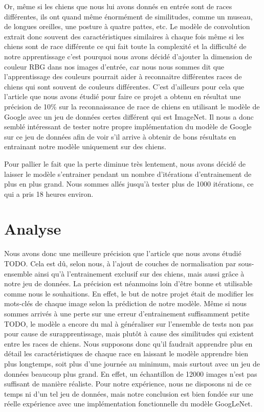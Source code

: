 \documentclass{article}
\begin{document}
Or, même si les chiens que nous lui avons donnés en entrée sont de races
différentes, ils ont quand même énormément de similitudes, comme un museau, de
longues oreilles, une posture à quatre pattes, etc. Le modèle de convolution
extrait donc souvent des caractéristiques similaires à chaque fois même si les
chiens sont de race différente ce qui fait toute la complexité et la difficulté
de notre apprentissage c’est pourquoi nous avons décidé d’ajouter la dimension
de couleur RBG dans nos images d’entrée, car nous nous sommes dit que
l’apprentissage des couleurs pourrait aider à reconnaitre différentes races de
chiens qui sont souvent de couleurs différentes. C’est d’ailleurs pour cela que
l’article que nous avons étudié pour faire ce projet a obtenu en résultat une
précision de 10\% sur la reconnaissance de race de chiens en utilisant le modèle
de Google avec un jeu de données certes différent qui est ImageNet. Il nous a
donc semblé intéressant de tester notre propre implémentation du modèle de
Google sur ce jeu de données afin de voir s'il arrive à obtenir de bons résultats
en entrainant notre modèle uniquement sur des chiens.

Pour pallier le fait que la perte diminue très lentement, nous avons décidé de
laisser le modèle s’entrainer pendant un nombre d’itérations d’entrainement de
plus en plus grand. Nous sommes allés jusqu’à tester plus de 1000 itérations, ce
qui a pris 18 heures environ.

\section{Analyse}
Nous avons donc une meilleure précision que l’article que nous avons étudié
TODO. Cela est dû, selon nous, à l’ajout de couches de normalisation par
sous-ensemble ainsi qu’à l’entrainement exclusif sur des chiens, mais aussi
grâce à notre jeu de données. La précision est néanmoins loin d’être bonne et
utilisable comme nous le souhaitions. En effet, le but de notre projet était de
modifier les mots-clés de chaque image selon la prédiction de notre modèle. Même
si nous sommes arrivés à une perte sur une erreur d’entrainement suffisamment
petite TODO, le modèle a encore du mal à généraliser sur l’ensemble de tests non
pas pour cause de surapprentissage, mais plutôt à cause des similitudes qui
existent entre les races de chiens. Nous supposons donc qu’il faudrait apprendre
plus en détail les caractéristiques de chaque race en laissant le modèle
apprendre bien plus longtemps, soit plus d’une journée au minimum, mais surtout
avec un jeu de données beaucoup plus grand. En effet, un échantillon de 12000
images n’est pas suffisant de manière réaliste. Pour notre expérience, nous ne
disposons ni de ce temps ni d’un tel jeu de données, mais notre conclusion est
bien fondée sur une réelle expérience avec une implémentation fonctionnelle du
modèle GoogLeNet.




\end{document}
